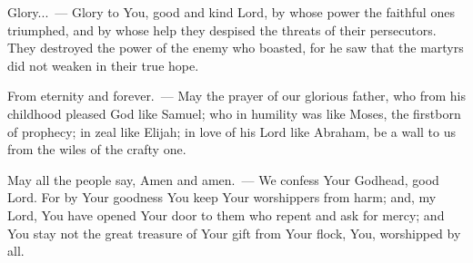 \documentclass[12pt,twoside,a5paper]{article}
\begin{document}
\begin{halfparskip}
  Glory...~--- Glory to You, good and kind Lord, by whose power the faithful ones triumphed, and by whose help they despised the threats of their persecutors. They destroyed the power of the enemy who boasted, for he saw that the martyrs did not weaken in their true hope.

  From eternity and forever.~--- May the prayer of our glorious father, who from his childhood pleased God like Samuel; who in humility was like Moses, the firstborn of prophecy; in zeal like Elijah; in love of his Lord like Abraham, be a wall to us from the wiles of the crafty one.

  May all the people say, Amen and amen.~--- We confess Your Godhead, good Lord. For by Your goodness You keep Your worshippers from harm; and, my Lord, You have opened Your door to them who repent and ask for mercy; and You stay not the great treasure of Your gift from Your flock, You, worshipped by all.
\end{halfparskip}

\end{document}
